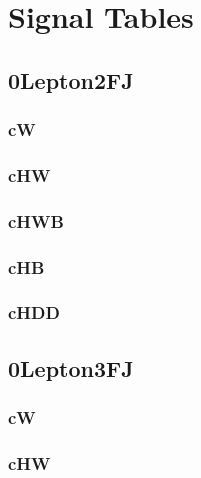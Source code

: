 \documentclass[landscape, 12pt,letterpaper]{article}
\begin{document}
\section{Signal Tables}
\subsection{0Lepton2FJ }
\subsubsection{cW}


\newpage

\subsubsection{cHW}


\newpage

\subsubsection{cHWB}


\newpage

\subsubsection{cHB}


\newpage

\subsubsection{cHDD}


\newpage

\newpage

\subsection{0Lepton3FJ }
\subsubsection{cW}


\newpage

\subsubsection{cHW}

\end{document}
